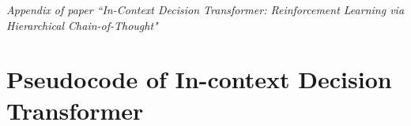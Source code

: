 \newpage
\appendix
\onecolumn
\large
\begin{center}
   \emph{Appendix of paper ``In-Context Decision Transformer: Reinforcement Learning via Hierarchical Chain-of-Thought"} 
\end{center} 
\normalsize

\section{Pseudocode of In-context Decision Transformer}
\label{appendix A}

